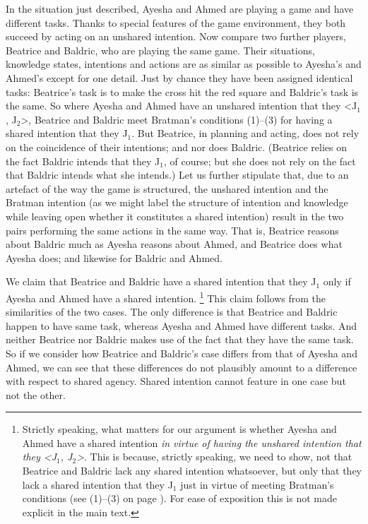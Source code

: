 \documentclass[12pt,\papersize]{extarticle}
\begin{document}
In the situation just described,
Ayesha and Ahmed are playing a game and have different tasks.
Thanks to special features of the game environment, they both succeed by acting on an unshared intention.
Now compare two further players, Beatrice and Baldric, who are playing the same game. 
Their situations, knowledge states, intentions and actions are as similar as possible to Ayesha's and Ahmed's except for one detail.
Just by chance they have been assigned identical tasks: Beatrice's task is to make the cross hit the red square and Baldric's task is the same.
So where Ayesha and Ahmed have an unshared intention that they <J$_1$, J$_2$>,
Beatrice and Baldric meet Bratman's conditions (1)--(3) for having a shared intention that they J$_1$.  
But Beatrice, in planning and acting, does not rely on the coincidence of their intentions; and nor does Baldric.
(Beatrice relies on the fact Baldric intends that they J$_1$, of course; but she does not rely on the fact that Baldric intends what she intends.) 
Let us further stipulate that, due to an artefact of the way the game is structured,
the unshared intention and the 
	Bratman intention 
	\label{df:bratman_intention}
	(as we might label the structure of intention and knowledge 
	while leaving open whether it constitutes a shared intention) result in the two pairs performing the same actions in the same way.
That is, Beatrice reasons about Baldric much as Ayesha reasons about Ahmed, and Beatrice does what Ayesha does; and likewise for Baldric and Ahmed. 


We claim that Beatrice and Baldric have a shared intention that they J$_1$
only if 
Ayesha and Ahmed have a shared intention.%
\footnote{
Strictly speaking, 
	what matters for our argument is whether Ayesha and Ahmed have a shared intention \emph{in virtue of having the unshared intention that they <J$_1$, J$_2$>}.
	This is because, strictly speaking, we need to show, not that Beatrice and Baldric lack any shared intention whatsoever, but only that they lack a shared intention that they J$_1$ just in virtue of meeting Bratman's conditions (see (1)--(3) on page  \pageref{quote:bratman_account}). 
	For ease of exposition this is not made explicit in the main text.
} 
This claim follows from the similarities of the two cases.
The only difference is that Beatrice and Baldric happen to have same task, whereas Ayesha and Ahmed have different tasks.
And neither Beatrice nor Baldric makes use of the fact that they have the same task. 
So if we consider  how  
		 Beatrice and Baldric's case
	differs from
		 that of Ayesha and Ahmed,
we can see that these differences do not plausibly amount to a difference with respect to shared agency.
Shared intention cannot feature in one case but not the other.
\end{document}
